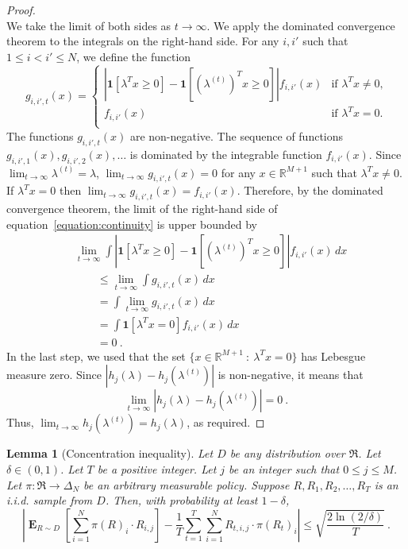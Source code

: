 \documentclass[12pt]{article}
\newcommand{\R}{\mathbb{R}}
\newcommand{\Requests}{\mathfrak{R}}
\DeclareMathOperator*{\Exp}{\mathbf{E}}
\newtheorem{lemma}[theorem]{Lemma}
\theoremstyle{definition}
\begin{document}
\begin{proof}
\begin{equation}
\end{equation}
We take the limit of both sides as $t \to \infty$. We apply the dominated
convergence theorem to the integrals on the right-hand side. For any $i,i'$ such
that $1 \le i < i' \le N$, we define the function
$$
g_{i,i',t}(x) =
\begin{cases}
\left| \mathbf{1} \left[ \lambda^T x \ge 0 \right]  -  \mathbf{1} \left[ (\lambda^{(t)})^T x \ge 0 \right] \right| f_{i,i'}(x) & \text{if $\lambda^T x \neq 0$,} \\
f_{i,i'}(x) & \text{if $\lambda^T x = 0$.} \\
\end{cases}
$$
The functions $g_{i,i',t}(x)$ are non-negative. The sequence of functions
$g_{i,i',1}(x), g_{i,i',2}(x), \dots$ is dominated by the integrable function
$f_{i,i'}(x)$. Since $\lim_{t \to \infty} \lambda^{(t)} = \lambda$, $\lim_{t \to
\infty} g_{i,i',t}(x) = 0$ for any $x \in \R^{M+1}$ such that $\lambda^T x \neq
0$. If $\lambda^T x = 0$ then $\lim_{t \to \infty} g_{i,i',t}(x) = f_{i,i'}(x)$.
Therefore, by the dominated convergence theorem, the limit of the right-hand
side of equation~\eqref{equation:continuity} is upper bounded by
\begin{align*}
& \lim_{t \to \infty} \int \left| \mathbf{1} \left[ \lambda^T x \ge 0 \right]  -  \mathbf{1} \left[ (\lambda^{(t)})^T x \ge 0 \right] \right| f_{i,i'}(x) \, dx \\
& \qquad \le \lim_{t \to \infty} \int g_{i,i',t}(x) \, dx \\
& \qquad = \int \lim_{t \to \infty} g_{i,i',t}(x) \, dx \\
& \qquad = \int \mathbf{1}[\lambda^T x = 0] f_{i,i'}(x) \, dx \\
& \qquad = 0 \: .
\end{align*}
In the last step, we used that the set $\{x \in \R^{M+1} ~:~ \lambda^T x = 0\}$
has Lebesgue measure zero. Since $|h_j(\lambda) - h_j(\lambda^{(t)})|$ is
non-negative, it means that
$$
\lim_{t \to \infty} |h_j(\lambda) - h_j(\lambda^{(t)})| = 0 \: .
$$
Thus, $\lim_{t \to \infty} h_j(\lambda^{(t)}) = h_j(\lambda)$, as required.
\end{proof}

\begin{lemma}[Concentration inequality]
\label{lemma:concentration-inequality}
Let $D$ be any distribution over $\Requests$. Let $\delta \in (0,1)$. Let $T$ be
a positive integer. Let $j$ be an integer such that $0 \le j \le M$.
Let $\pi: \Requests \to \Delta_N$ be an arbitrary measurable policy.
Suppose $R, R_1, R_2, \dots, R_T$ is an i.i.d. sample from $D$.
Then, with probability at least $1-\delta$,
$$
\left| \Exp_{R \sim D} \left[ \sum_{i=1}^N \pi(R)_i \cdot R_{i,j} \right]  -  \frac{1}{T} \sum_{t=1}^T \sum_{i=1}^N R_{t,i,j} \cdot \pi(R_t)_i  \right|
\le \sqrt{ \frac{2\ln(2/\delta)}{T}} \: .
$$
\end{lemma}
\end{document}

